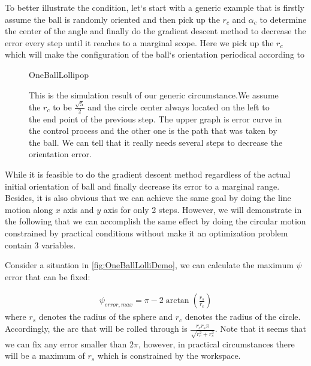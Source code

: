 \documentclass[letter paper, 10pt, conference]{ieeeconf}
\newcommand{\todo}[1]{\vspace{5 mm}\par \noindent \framebox{\begin{minipage}[c]{0.98 \columnwidth} \ttfamily\flushleft \textcolor{red}{#1}\end{minipage}}\vspace{5 mm}\par}
\begin{document}
To better illustrate the condition, let`s start with a generic example that is firstly assume the ball is randomly oriented and then pick up the $r_c$ and $\alpha_c$ to determine the center of the angle and finally do the gradient descent method to decrease the error every step until it reaches to a marginal scope. Here we pick up the $r_c$ which will make the configuration of the ball`s orientation periodical according to \todo{ [[insert references:Ball Rolling and Cone]] }
    \begin{figure}%
	\begin{center}
	\begin{overpic}[width=.9\columnwidth]{OneBallLollipop}
	\end{overpic}
	\end{center}
	\vspace{-1em}
	\caption{ \label{fig:OneBallLollipop} This is the simulation result of our generic circumstance.We assume the $r_c$ to be $\frac{\sqrt{5}}{2}$ and the circle center always located on the left to the end point of the previous step. The upper graph is error curve in the control process and the other one is the path that was taken by the ball. We can tell that it really needs several steps to decrease the orientation error.
}\vspace{-1em}
\end{figure}

While it is feasible to do the gradient descent method regardless of the actual initial orientation of ball and finally decrease its error to a marginal range. Besides, it is also obvious that we can achieve the same goal by doing the line motion along $x$ axis and $y$ axis for only 2 steps. However, we will demonstrate in the following that we can accomplish the same effect by doing the circular motion constrained by practical conditions without make it an optimization problem contain 3 variables.

Consider a situation in \ref{fig:OneBallLolliDemo}, we can calculate the maximum $\psi$ error that can be fixed:

\begin{align}
\psi_{error,max}=\pi-2 \arctan(\frac{r_s}{r_c})
\label{eq:MaxErrorFixed}
\end{align}
where $r_s$ denotes the radius of the sphere and $r_c$ denotes the radius of the circle. Accordingly, the arc that will be rolled through is $\frac{r_cr_s\pi}{\sqrt{r_c^2+r_s^2}}$. Note that it seems that we can fix any error smaller than $2\pi$, however, in practical circumstances there will be a maximum of $r_s$ which is constrained by the workspace.
\end{document}
